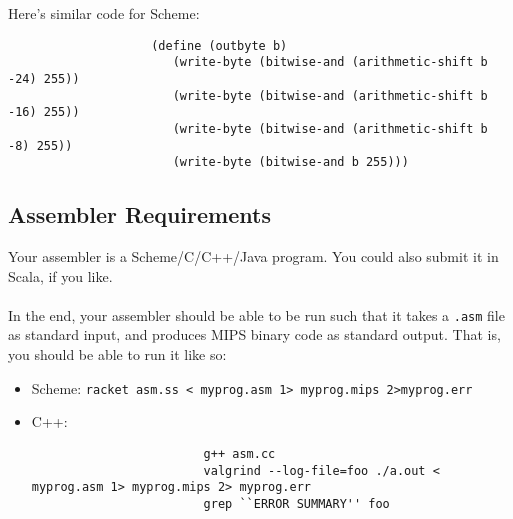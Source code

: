 \documentclass[]{article}
\theoremstyle{definition}
\newcommand{\lecture}[1]{\marginpar{{\footnotesize $\leftarrow$ \underline{#1}}}}
\begin{document}
				Here's similar code for Scheme:
				\begin{verbatim}
					(define (outbyte b)
					   (write-byte (bitwise-and (arithmetic-shift b -24) 255))
					   (write-byte (bitwise-and (arithmetic-shift b -16) 255))
					   (write-byte (bitwise-and (arithmetic-shift b -8) 255))
					   (write-byte (bitwise-and b 255)))
				\end{verbatim}
		\subsection{Assembler Requirements} \lecture{January 25, 2013}
			Your assembler is a Scheme/C/C++/Java program. You could also submit it in Scala, if you like.
			\\ \\
			In the end, your assembler should be able to be run such that it takes a \verb+.asm+ file as standard input, and produces MIPS binary code as standard output. That is, you should be able to run it like so:
			\begin{itemize}
				\item Scheme: \verb+racket asm.ss < myprog.asm 1> myprog.mips 2>myprog.err+
				\item C++:
					\begin{verbatim}
						g++ asm.cc
						valgrind --log-file=foo ./a.out < myprog.asm 1> myprog.mips 2> myprog.err
						grep ``ERROR SUMMARY'' foo
					\end{verbatim}
			\end{itemize}
				
\end{document}
